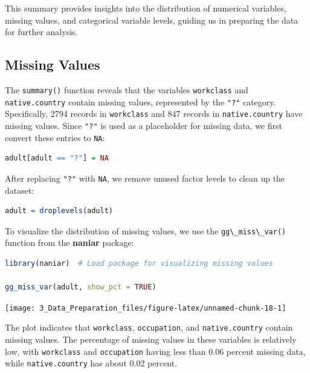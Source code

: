 \documentclass[
  11pt,
]{book}
\newcommand{\passthrough}[1]{#1}
\theoremstyle{definition}
\theoremstyle{definition}
\theoremstyle{definition}
\theoremstyle{definition}
\theoremstyle{remark}
\begin{document}
This summary provides insights into the distribution of numerical variables, missing values, and categorical variable levels, guiding us in preparing the data for further analysis.

\subsection{Missing Values}\label{missing-values-1}

The \passthrough{\lstinline!summary()!} function reveals that the variables \passthrough{\lstinline!workclass!} and \passthrough{\lstinline!native.country!} contain missing values, represented by the \passthrough{\lstinline!"?"!} category. Specifically, 2794 records in \passthrough{\lstinline!workclass!} and 847 records in \passthrough{\lstinline!native.country!} have missing values. Since \passthrough{\lstinline!"?"!} is used as a placeholder for missing data, we first convert these entries to \passthrough{\lstinline!NA!}:

\begin{lstlisting}[language=R]
adult[adult == "?"] = NA
\end{lstlisting}

After replacing \passthrough{\lstinline!"?"!} with \passthrough{\lstinline!NA!}, we remove unused factor levels to clean up the dataset:

\begin{lstlisting}[language=R]
adult = droplevels(adult)
\end{lstlisting}

To visualize the distribution of missing values, we use the \passthrough{\lstinline!gg\_miss\_var()!} function from the \textbf{naniar} package:

\begin{lstlisting}[language=R]
library(naniar)  # Load package for visualizing missing values

gg_miss_var(adult, show_pct = TRUE)
\end{lstlisting}

\begin{center}\texttt{[image: 3\_Data\_Preparation\_files/figure-latex/unnamed-chunk-18-1]} \end{center}

The plot indicates that \passthrough{\lstinline!workclass!}, \passthrough{\lstinline!occupation!}, and \passthrough{\lstinline!native.country!} contain missing values. The percentage of missing values in these variables is relatively low, with \passthrough{\lstinline!workclass!} and \passthrough{\lstinline!occupation!} having less than 0.06 percent missing data, while \passthrough{\lstinline!native.country!} has about 0.02 percent.
\end{document}
